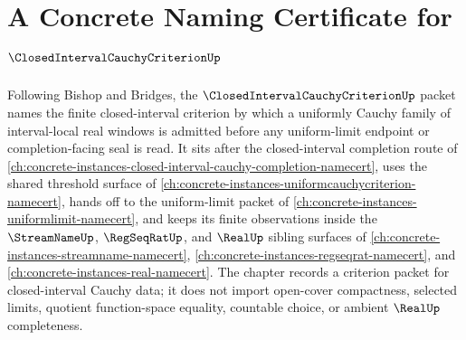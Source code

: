 \chapter{A Concrete Naming Certificate for $\ClosedIntervalCauchyCriterionUp$}
\label{ch:concrete-instances-closed-interval-cauchy-criterion-namecert}

Following Bishop and Bridges, the $\ClosedIntervalCauchyCriterionUp$ packet names the finite closed-interval criterion by which a uniformly Cauchy family of interval-local real windows is admitted before any uniform-limit endpoint or completion-facing seal is read. It sits after the closed-interval completion route of \autoref{ch:concrete-instances-closed-interval-cauchy-completion-namecert}, uses the shared threshold surface of \autoref{ch:concrete-instances-uniformcauchycriterion-namecert}, hands off to the uniform-limit packet of \autoref{ch:concrete-instances-uniformlimit-namecert}, and keeps its finite observations inside the $\StreamNameUp$, $\RegSeqRatUp$, and $\RealUp$ sibling surfaces of \autoref{ch:concrete-instances-streamname-namecert}, \autoref{ch:concrete-instances-regseqrat-namecert}, and \autoref{ch:concrete-instances-real-namecert}. The chapter records a criterion packet for closed-interval Cauchy data; it does not import open-cover compactness, selected limits, quotient function-space equality, countable choice, or ambient $\RealUp$ completeness.

